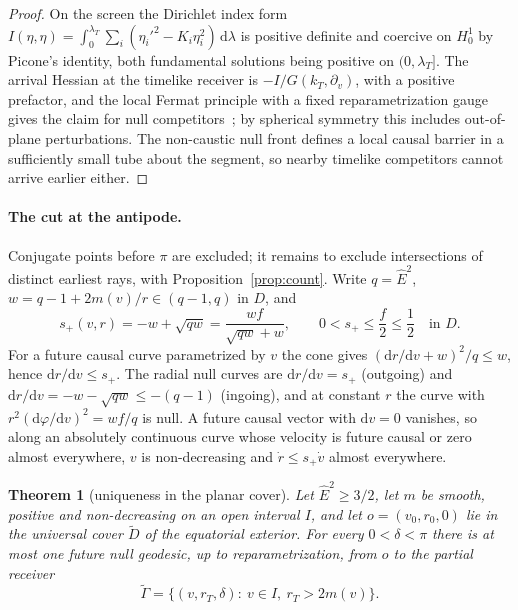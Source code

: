\documentclass[aip,jmp,amsmath,amssymb,reprint]{revtex4-2}
\newcommand{\Ehat}{\hat E}
\newcommand{\dd}{\mathrm{d}}
\theoremstyle{plain}
\newtheorem{theorem}{Theorem}
\theoremstyle{definition}
\begin{document}
\begin{proof}
On the screen the Dirichlet index form
$I(\eta,\eta)=\int_0^{\lambda_T}\sum_i(\eta_i'^2-K_i\eta_i^2)\,\dd\lambda$ is positive definite and
coercive on $H^1_0$ by Picone's identity, both fundamental solutions being positive on
$(0,\lambda_T]$. The arrival Hessian at the timelike receiver is $-I/G(k_T,\partial_v)$, with a
positive prefactor, and the local Fermat principle with a fixed reparametrization gauge gives
the claim for null competitors~\cite{GiannoniMasielloPiccioneFermat}; by spherical symmetry this
includes out-of-plane perturbations. The non-caustic null front defines a local causal barrier
in a sufficiently small tube about the segment, so nearby timelike competitors cannot arrive
earlier either.
\end{proof}

\paragraph{The cut at the antipode.} Conjugate points before $\pi$ are excluded; it remains to
exclude intersections of distinct earliest rays, with Proposition~\ref{prop:count}. Write $q=\Ehat^2$,
$w=q-1+2m(v)/r\in(q-1,q)$ in $D$, and
\[
  s_+(v,r)=-w+\sqrt{qw}=\frac{wf}{\sqrt{qw}+w},\qquad 0<s_+\le\frac f2\le\frac12 \quad\text{in } D .
\]
For a future causal curve parametrized by $v$ the cone gives $(\dd r/\dd v+w)^2/q\le w$, hence
$\dd r/\dd v\le s_+$. The radial null curves are $\dd r/\dd v=s_+$ (outgoing) and
$\dd r/\dd v=-w-\sqrt{qw}\le-(q-1)$ (ingoing), and at constant $r$ the curve with
$r^2(\dd\varphi/\dd v)^2=wf/q$ is null. A future causal vector with $\dd v=0$ vanishes, so along an
absolutely continuous curve whose velocity is future causal or zero almost everywhere, $v$ is
non-decreasing and $\dot r\le s_+\dot v$ almost everywhere.

\begin{theorem}[uniqueness in the planar cover]\label{thm:vaidya-cover-unique}
Let $\Ehat^2\ge3/2$, let $m$ be smooth, positive and non-decreasing on an open interval $I$, and
let $o=(v_0,r_0,0)$ lie in the universal cover $\widetilde D$ of the equatorial exterior. For every
$0<\delta<\pi$ there is at most one future null geodesic, up to reparametrization, from $o$ to the
partial receiver
\[
  \widetilde\Gamma=\{(v,r_T,\delta):\ v\in I,\ r_T>2m(v)\}.
\]
\end{theorem}
\end{document}
